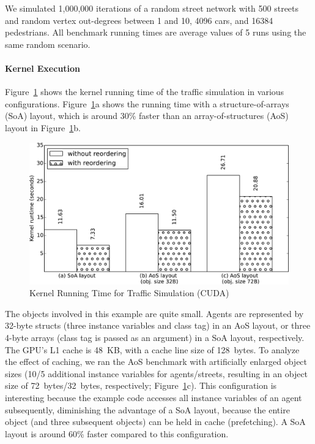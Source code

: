 \documentclass[preprint]{sigplanconf}
\begin{document}
We simulated 1,000,000 iterations of a random street network with 500 streets and random vertex out-degrees between 1 and 10, 4096 cars, and 16384 pedestrians. All benchmark running times are average values of 5 runs using the same random scenario.

\paragraph{Kernel Execution}
Figure~\ref{fig:bench_kernel} shows the kernel running time of the traffic simulation in various configurations. Figure~\ref{fig:bench_kernel}a shows the running time with a structure-of-arrays (SoA) layout, which is around 30\% faster than an array-of-structures (AoS) layout in Figure~\ref{fig:bench_kernel}b.

\begin{figure}[!htp]
    \includegraphics[width=\columnwidth]{bench_1.pdf}
    \centering
    \caption{Kernel Running Time for Traffic Simulation (CUDA)}
    \label{fig:bench_kernel}
\end{figure}

The objects involved in this example are quite small. Agents are represented by 32-byte structs (three instance variables and class tag) in an AoS layout, or three 4-byte arrays (class tag is passed as an argument) in a SoA layout, respectively. The GPU's L1 cache is 48~KB, with a cache line size of 128~bytes. To analyze the effect of caching, we ran the AoS benchmark with artificially enlarged object sizes (10/5 additional instance variables for agents/streets, resulting in an object size of 72~bytes/32~bytes, respectively; Figure~\ref{fig:bench_kernel}c). This configuration is interesting because the example code accesses all instance variables of an agent subsequently, diminishing the advantage of a SoA layout, because the entire object (and three subsequent objects) can be held in cache (prefetching). A SoA layout is around 60\% faster compared to this configuration.
\end{document}
